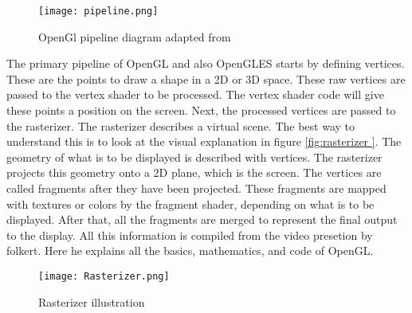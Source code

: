 \begin{figure}[!h]
    \centering
    \texttt{[image: pipeline.png]}
    \caption{OpenGl pipeline diagram adapted from \cite{androidmakersbenjaminmonjoie2017}}
    \label{fig:openglpipeline}
\end{figure}
The primary pipeline of OpenGL and also OpenGLES starts by defining vertices. These are the points to draw a shape in a 2D or 3D space. These raw vertices are passed to the vertex shader to be processed. The vertex shader code will give these points a position on the screen. Next, the processed vertices are passed to the rasterizer. The rasterizer describes a virtual scene. The best way to understand this is to look at the visual explanation in figure \ref{fig:rasterizer  }. The geometry of what is to be displayed is described with vertices. The rasterizer projects this geometry onto a 2D plane, which is the screen. The vertices are called fragments after they have been projected. These fragments are mapped with textures or colors by the fragment shader, depending on what is to be displayed. After that, all the fragments are merged to represent the final output to the display. All this information is compiled from the video presetion\cite{media.ccc.defolkert2019} by folkert. Here he explains all the basics, mathematics, and code of OpenGL.
\clearpage
\begin{figure}[]
    \texttt{[image: Rasterizer.png]}
    \caption{Rasterizer illustration}
    \label{fig:rasterizer}
\end{figure}


